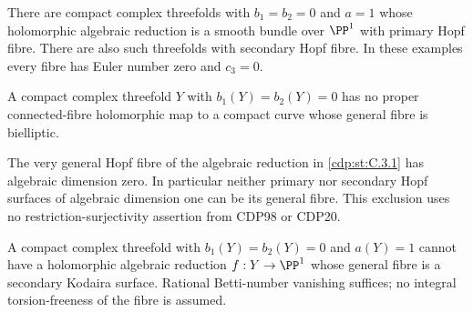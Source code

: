 \begin{proposition}\hypertarget{tag-01FC}{}\label{cdp:st:C.3.6}



There are compact complex threefolds with $b_1=b_2=0$ and $a=1$
whose holomorphic algebraic reduction is a smooth bundle over
$\PP^1$ with primary Hopf fibre. There are also such threefolds
with secondary Hopf fibre. In these examples every fibre has Euler
number zero and $c_3=0$.
\end{proposition}

\begin{proposition}\hypertarget{tag-01FD}{}\label{cdp:st:C.3.7}



A compact complex threefold $Y$ with $b_1(Y)=b_2(Y)=0$ has no
proper connected-fibre holomorphic map to a compact curve whose
general fibre is bielliptic.
\end{proposition}

\begin{proposition}\hypertarget{tag-01FE}{}\label{cdp:st:C.3.8}



The very general Hopf fibre of the algebraic reduction in \ref{cdp:st:C.3.1}
has algebraic dimension zero. In particular neither primary nor
secondary Hopf surfaces of algebraic dimension one can be its
general fibre. This exclusion uses no restriction-surjectivity
assertion from CDP98 or CDP20.
\end{proposition}

\begin{proposition}\hypertarget{tag-01FF}{}\label{cdp:st:C.3.9}



A compact complex threefold with $b_1(Y)=b_2(Y)=0$ and
$a(Y)=1$ cannot have a holomorphic algebraic reduction
$f:Y\to\PP^1$ whose general fibre is a secondary Kodaira
surface. Rational Betti-number vanishing suffices; no integral
torsion-freeness of the fibre is assumed.
\end{proposition}

